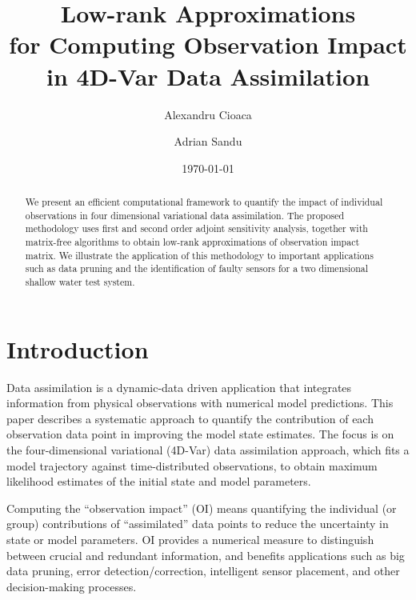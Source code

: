 \documentclass[final,sort&compress]{elsarticle}
\begin{document}
\newpage
\clearpage{}

\title{Low-rank Approximations \\ for Computing Observation Impact \\ in 4D-Var Data Assimilation}

\date{\today}

\author{Alexandru Cioaca}
\author{Adrian Sandu}



\begin{abstract}

We present an efficient computational framework to quantify the impact of individual observations in four dimensional variational data assimilation.
The proposed methodology uses first and second order adjoint sensitivity analysis, together with
matrix-free algorithms to obtain low-rank approximations of observation impact matrix. 
We illustrate the application of this methodology to important applications such as data pruning and the identification of faulty sensors
for a two dimensional shallow water test system.
 
\end{abstract}

\maketitle

\newpage

\tableofcontents

\newpage
\setcounter{page}{1}

\section{Introduction}


Data assimilation is a dynamic-data driven application that integrates information from physical observations with numerical model predictions. 
This paper describes a systematic approach to quantify the contribution of each observation data point in improving the model state estimates.
The focus is on the four-dimensional variational (4D-Var) data assimilation approach, which fits a model trajectory against time-distributed observations,
to obtain maximum likelihood estimates of the initial state and model parameters. 


Computing the ``observation impact'' (OI) means quantifying the individual (or group) contributions of ``assimilated'' data points to 
reduce the uncertainty in state or model parameters. OI provides a numerical measure to distinguish between crucial and redundant information,
and benefits applications such as big data pruning, error detection/correction, 
intelligent sensor placement, and other decision-making processes.
\end{document}
